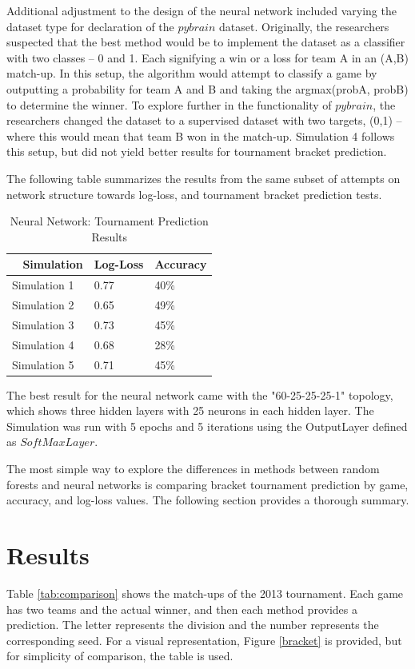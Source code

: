 \documentclass[conference]{IEEEtran}
\begin{document}
{Additional adjustment to the design of the neural network included varying the dataset type for declaration of the $pybrain$ dataset.
Originally, the researchers suspected that the best method would be to implement the dataset as a classifier with two classes -- 0 and 1.
Each signifying a win or a loss for team A in an (A,B) match-up.
In this setup, the algorithm would attempt to classify a game by outputting a probability for team A and B and taking the argmax(probA, probB) to determine the winner.
To explore further in the functionality of $pybrain$, the researchers changed the dataset to a supervised dataset with two targets, (0,1) -- where this would mean that team B won in the match-up.
Simulation 4 follows this setup, but did not yield better results for tournament bracket prediction.

The following table summarizes the results from the same subset of attempts on network structure towards log-loss, and tournament bracket prediction tests.

\begin{table}[H]
	\centering
    \begin{tabular}{|l|l|l|}
    \hline
    ~   \textbf{Simulation} & \textbf{Log-Loss} & \textbf{Accuracy}\\ \hline
    	Simulation 1 		& 0.77 				& 40\%\\ \hline
    	Simulation 2 		& 0.65 				& 49\% \\ \hline
    	Simulation 3 		& 0.73 				& 45\% \\ \hline
    	Simulation 4 		& 0.68 				& 28\% \\ \hline    
    	Simulation 5 		& 0.71 				& 45\% \\ \hline	
    \end{tabular}
    \caption {Neural Network: Tournament Prediction Results}
    \label{tab:nn-pred}
\end{table}
The best result for the neural network came with the "60-25-25-25-1" topology, which shows three hidden layers with 25 neurons in each hidden layer.
The Simulation was run with 5 epochs and 5 iterations using the OutputLayer defined as $SoftMaxLayer$.

The most simple way to explore the differences in methods between random forests and neural networks is comparing bracket tournament prediction by game, accuracy, and log-loss values.
The following section provides a thorough summary. 

\section{Results}
Table \ref{tab:comparison} shows the match-ups of the 2013 tournament. 
Each game has two teams and the actual winner, and then each method provides a prediction. 
The letter represents the division and the number represents the corresponding seed.
For a visual representation, Figure \ref{bracket} is provided, but for simplicity of comparison, the table is used.

}
\end{document}

